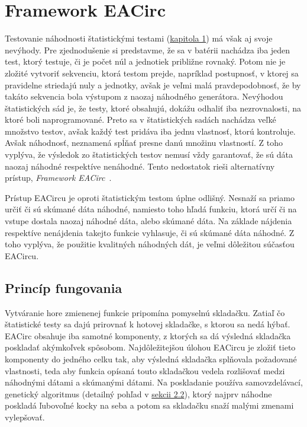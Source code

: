 \chapter{Framework EACirc}
\label{chap:eacirc}

Testovanie náhodnosti štatistickými testami (\hyperref[chap:statistic-tests]{kapitola 1}) má však aj svoje nevýhody. Pre zjednodušenie si predstavme, že sa v batérii nachádza iba jeden test, ktorý testuje, či je počet núl a jednotiek približne rovnaký. Potom nie je zložité vytvoriť sekvenciu, ktorá testom prejde, napríklad postupnosť, v ktorej sa pravidelne striedajú nuly a jednotky, avšak je veľmi malá pravdepodobnosť, že by takáto sekvencia bola výstupom z naozaj náhodného generátora. Nevýhodou štatistických sád je, že testy, ktoré obsahujú, dokážu odhaliť iba nezrovnalosti, na ktoré boli naprogramované. Preto sa v štatistických sadách nachádza veľké množstvo testov, avšak každý test pridáva iba jednu vlastnosť, ktorú kontroluje. Avšak náhodnosť, neznamená spĺňať presne danú množinu vlastností. Z toho vyplýva, že výsledok zo štatistických testov nemusí vždy garantovať, že sú dáta naozaj náhodné respektíve nenáhodné. Tento nedostatok rieši alternatívny prístup, \textit{Framework EACirc}~\parencite{ukrop-bc}. 

Prístup EACircu je oproti štatistickým testom úplne odlišný. Nesnaží sa priamo určiť či sú skúmané dáta náhodné, namiesto toho hľadá funkciu, ktorá určí či na vstupe dostala naozaj náhodné dáta, alebo skúmané dáta. Na základe nájdenia respektíve nenájdenia takejto funkcie vyhlasuje, či sú skúmané dáta náhodné. Z toho vyplýva, že použitie kvalitných náhodných dát, je veľmi dôležitou súčasťou EACircu. 

\section{Princíp fungovania}
\label{sec:principle}

Vytváranie hore zmienenej funkcie pripomína pomyselnú skladačku. Zatiaľ čo štatistické testy sa dajú prirovnať k hotovej skladačke, s ktorou sa nedá hýbať. EACirc obsahuje iba samotné komponenty, z ktorých sa dá výsledná skladačka poskladať akýmkoľvek spôsobom. Najdôležitejšou úlohou EACircu je zložiť tieto komponenty do jedného celku tak, aby výsledná skladačka splňovala požadované vlastnosti, teda aby funkcia opísaná touto skladačkou vedela rozlišovať medzi náhodnými dátami a skúmanými dátami. Na poskladanie používa samovzdelávací, genetický algoritmus (detailný pohľad v \hyperref[sec:genetics]{sekcii 2.2}), ktorý najprv náhodne poskladá ľubovoľné kocky na seba a potom sa skladačku snaží malými zmenami vylepšovať.

